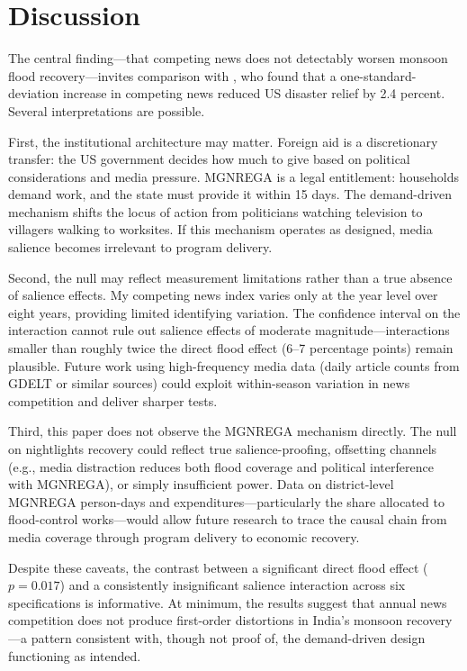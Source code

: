 \documentclass[12pt]{article}
\begin{document}
\section{Discussion}

The central finding---that competing news does not detectably worsen monsoon flood recovery---invites comparison with \citet{eisensee2007}, who found that a one-standard-deviation increase in competing news reduced US disaster relief by 2.4 percent. Several interpretations are possible.

First, the institutional architecture may matter. Foreign aid is a discretionary transfer: the US government decides how much to give based on political considerations and media pressure. MGNREGA is a legal entitlement: households demand work, and the state must provide it within 15 days. The demand-driven mechanism shifts the locus of action from politicians watching television to villagers walking to worksites. If this mechanism operates as designed, media salience becomes irrelevant to program delivery.

Second, the null may reflect measurement limitations rather than a true absence of salience effects. My competing news index varies only at the year level over eight years, providing limited identifying variation. The confidence interval on the interaction cannot rule out salience effects of moderate magnitude---interactions smaller than roughly twice the direct flood effect (6--7 percentage points) remain plausible. Future work using high-frequency media data (daily article counts from GDELT or similar sources) could exploit within-season variation in news competition and deliver sharper tests.

Third, this paper does not observe the MGNREGA mechanism directly. The null on nightlights recovery could reflect true salience-proofing, offsetting channels (e.g., media distraction reduces both flood coverage and political interference with MGNREGA), or simply insufficient power. Data on district-level MGNREGA person-days and expenditures---particularly the share allocated to flood-control works---would allow future research to trace the causal chain from media coverage through program delivery to economic recovery.

Despite these caveats, the contrast between a significant direct flood effect ($p = 0.017$) and a consistently insignificant salience interaction across six specifications is informative. At minimum, the results suggest that annual news competition does not produce first-order distortions in India's monsoon recovery---a pattern consistent with, though not proof of, the demand-driven design functioning as intended.
\end{document}
